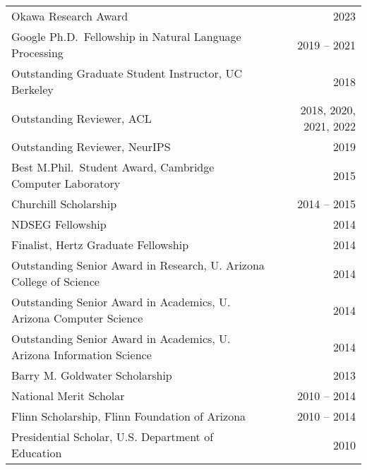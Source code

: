 \vspace{6pt}
\begin{longtable}{@{\hspace*{-3pt}}lr}
    Okawa Research Award & 2023 \\
    Google Ph.D.\ Fellowship in Natural Language Processing & 2019 -- 2021 \\
    Outstanding Graduate Student Instructor, UC Berkeley & 2018 \\
    Outstanding Reviewer, ACL & 2018, 2020, 2021, 2022 \\
    Outstanding Reviewer, NeurIPS & 2019 \\
    Best M.Phil.\ Student Award, Cambridge Computer Laboratory & 2015 \\
    Churchill Scholarship & 2014 -- 2015 \\
    NDSEG Fellowship & 2014 \\
    Finalist, Hertz Graduate Fellowship & 2014 \\
    Outstanding Senior Award in Research, U. Arizona College of Science & 2014 \\
    Outstanding Senior Award in Academics, U. Arizona Computer Science & 2014 \\
    Outstanding Senior Award in Academics, U. Arizona Information Science & 2014 \\
    Barry M. Goldwater Scholarship & 2013 \\
    National Merit Scholar & 2010 -- 2014 \\
    Flinn Scholarship, Flinn Foundation of Arizona & 2010 -- 2014 \\
    Presidential Scholar, U.S. Department of Education & 2010 \\
\end{longtable}




